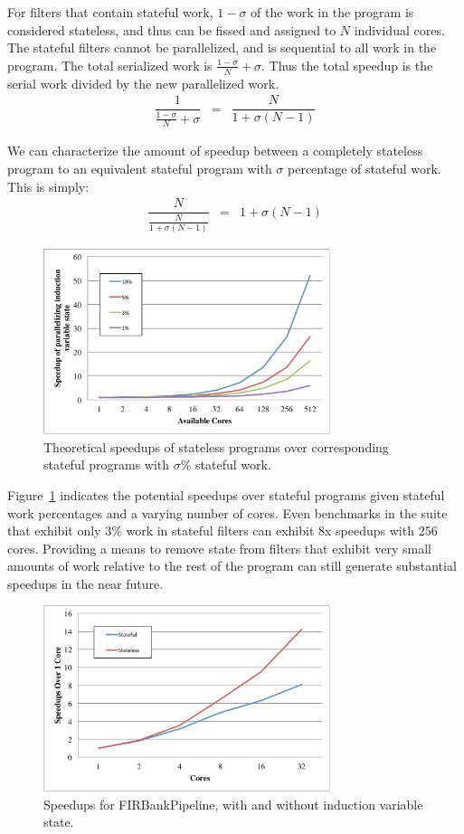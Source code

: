 For filters that contain stateful work, $1-\sigma$ of the work in the program is considered stateless, and thus can be fissed and assigned to $N$ individual cores.  The stateful filters cannot be parallelized, and is sequential to all work in the program.  The total serialized work is $\frac{1-\sigma}{N} + \sigma$.  Thus the total speedup is the serial work divided by the new parallelized work.  
\begin{eqnarray*}
\dfrac{1}{\frac{1-\sigma}{N} + \sigma} &=& \dfrac{N}{1 + \sigma(N-1)}
\end{eqnarray*}

We can characterize the amount of speedup between a completely stateless program to an equivalent stateful program with $\sigma$ percentage of stateful work.  This is simply:
\begin{eqnarray*}
\dfrac{N}{\frac{N}{1 + \sigma(N-1)}} &=& 1 + \sigma(N-1)
\end{eqnarray*}

\begin{figure}[t!]
\includegraphics[width=3.3in]{figures/theoretic-speedup.pdf}
\caption{Theoretical speedups of stateless programs over corresponding stateful programs with $\sigma$\% stateful work.  \protect\label{fig:theo-speedups}}
\end{figure}

Figure~\ref{fig:theo-speedups} indicates the potential speedups over stateful programs given stateful work percentages and a varying number of cores.  Even benchmarks in the suite that exhibit only 3\% work in stateful filters can exhibit 8x speedups with 256 cores.  Providing a means to remove state from filters that exhibit very small amounts of work relative to the rest of the program can still generate substantial speedups in the near future.

\begin{figure}[t]
\includegraphics[width=3.3in]{figures/firbank-results.pdf}
\caption{Speedups for FIRBankPipeline, with and without induction variable state.  \protect\label{fig:firbank-results}}
\end{figure}

